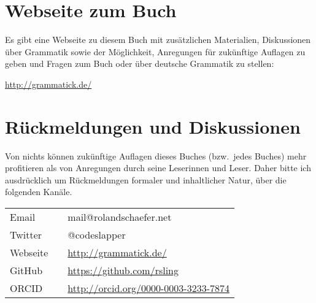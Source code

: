 \section*{Webseite zum Buch}

Es gibt eine Webseite zu diesem Buch mit zusätzlichen Materialien, Diskussionen über Grammatik sowie der Möglichkeit, Anregungen für zukünftige Auflagen zu geben und Fragen zum Buch oder über deutsche Grammatik zu stellen:

\begin{center}
  \Large \url{http://grammatick.de/}
\end{center}

\section*{Rückmeldungen und Diskussionen}

Von nichts können zukünftige Auflagen dieses Buches (bzw.\ jedes Buches) mehr profitieren als von Anregungen durch seine Leserinnen und Leser.
Daher bitte ich ausdrücklich um Rückmeldungen formaler und inhaltlicher Natur, \zB über die folgenden Kanäle.

\begin{center}
  \begin{tabular}{lp{2mm}l}
    Email && mail@rolandschaefer.net \\
    Twitter && @codeslapper \\
    Webseite && \url{http://grammatick.de/} \\ 
    GitHub && \url{https://github.com/rsling} \\
    ORCID && \url{http://orcid.org/0000-0003-3233-7874} \\
  \end{tabular}
\end{center}
